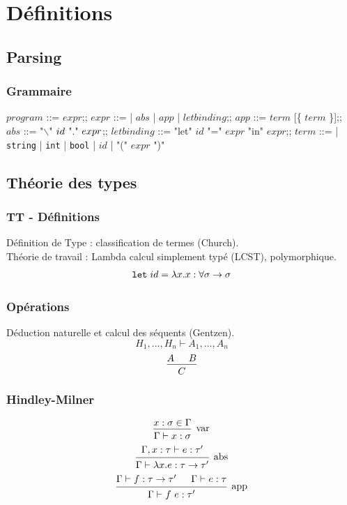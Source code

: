 \documentclass{beamer}
\begin{document}
\section{Définitions}
\subsection{Parsing}
\begin{frame}
		\frametitle{Grammaire}
		\begin{bnf}
				$program$ ::= $expr$;;
				$expr$ ::= | $abs$ | $app$ | $letbinding$;;
				$app$ ::= $term$ [\{ $term$ \}];;
				$abs$ ::= "$\backslash$" $id\space$ "." $\space expr$;;
				$letbinding$ ::= "let" $id$ "=" $expr$ "in" $expr$;;
				$term$ ::= | \texttt{string} | \texttt{int} | \texttt{bool} | $id$ | "(" $expr$ ")"
		\end{bnf} 
\end{frame}

\subsection{Théorie des types}
\begin{frame}
		\frametitle{TT - Définitions}
		Définition de Type : classification de termes (Church).\\
		Théorie de travail : Lambda calcul simplement typé (LCST), polymorphique.\\
		\[
				\texttt{let\;} id = \lambda x.x :\forall \sigma\to\sigma
		\]
\end{frame}

\begin{frame}
		\frametitle{Opérations}
		Déduction naturelle et calcul des séquents (Gentzen).
		\[
				H_1,...,H_n \vdash A_1,...,A_n
		\]
		\[
		\begin{prooftree}
				\hypo{A}
				\hypo{B}
				\infer2{C}
		\end{prooftree}
		\]
\end{frame}

\begin{frame}
\frametitle{Hindley-Milner}
		\[
		\begin{prooftree}
				\hypo{x:\sigma\in\Gamma}
				\infer1[var]{\Gamma \vdash x:\sigma}
		\end{prooftree}
		\]
		\newline
		\[
		\begin{prooftree}
				\hypo{\Gamma, x:\tau \vdash e:\tau'}
				\infer1[abs]{\Gamma \vdash \lambda x.e:\tau \to \tau'}
		\end{prooftree}
		\]
		\newline
		\[
		\begin{prooftree}
				\hypo{\Gamma \vdash f:\tau \to \tau'}
				\hypo{\Gamma \vdash e : \tau}
				\infer2[app]{\Gamma \vdash f\ e : \tau'}
		\end{prooftree}
		\]
\end{frame}
\end{document}
